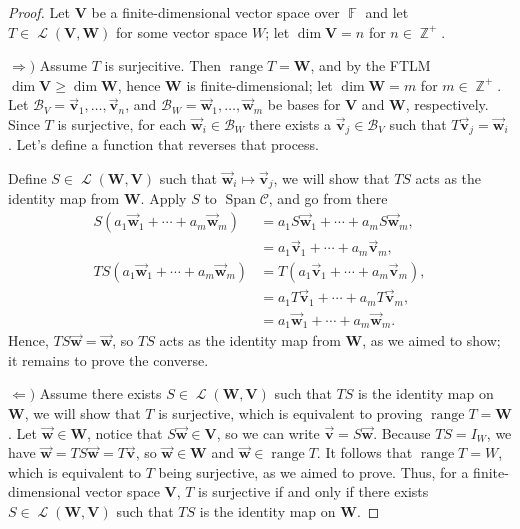 \documentclass[letterpaper, 12pt]{amsart}
\DeclareMathOperator{\Z}{\mathbb{Z}}
\DeclareMathOperator{\F}{\mathbb{F}}
\DeclareMathOperator{\range}{\text{range }}
\DeclareMathOperator{\Ell}{\mathscr{L}}
\newcommand{\bvec}[1]{{\vec{\mathbf{#1}}}}
\theoremstyle{definition}  %
\DeclareMathOperator{\Span}{Span}
\newcommand{\Ra}{\Rightarrow}                   %
\newcommand{\La}{\Leftarrow}                    %
\begin{document}
		\begin{proof}
		Let $\mathbf{V}$ be a finite-dimensional vector space over $\F$ and let $T \in \Ell(\mathbf{V},\mathbf{W})$ for some vector space $W$; let $\dim \mathbf{V} = n$ for $n \in \Z^{+}$.

		$\Ra)$ Assume $T$ is surjecitive.
		Then $\range T = \mathbf{W}$, and by the FTLM $\dim \mathbf{V} \geq \dim \mathbf{W}$, hence $\mathbf{W}$ is finite-dimensional; let $\dim \mathbf{W} = m$ for $m \in \Z^{+}$.
		Let $\mathcal{B}_{V} = \bvec{v}_{1}, \dots, \bvec{v}_{n}$, and $\mathcal{B}_{W} = \bvec{w}_{1}, \dots, \bvec{w}_{m}$ be bases for $\mathbf{V}$ and $\mathbf{W}$, respectively.
		Since $T$ is surjective, for each $\bvec{w}_{i} \in \mathcal{B}_{W}$ there exists a $\bvec{v}_{j} \in \mathcal{B}_{V}$ such that $T\bvec{v}_{j} = \bvec{w}_{i}$.
		Let's define a function that reverses that process.

		Define $S \in \Ell(\mathbf{W},\mathbf{V})$ such that $\bvec{w}_{i} \mapsto \bvec{v}_{j}$, we will show that $TS$ acts as the identity map from $\mathbf{W}$.
		Apply $S$ to $\Span \mathcal{C}$, and go from there
			\begin{align*}
				S(a_{1}\bvec{w}_{1} + \cdots + a_{m}\bvec{w}_{m}) &= a_{1}S\bvec{w}_{1} + \cdots + a_{m}S\bvec{w}_{m}, \\
				&= a_{1}\bvec{v}_{1} + \cdots + a_{m}\bvec{v}_{m}, \\
				TS(a_{1}\bvec{w}_{1} + \cdots + a_{m}\bvec{w}_{m}) &= T(a_{1}\bvec{v}_{1} + \cdots + a_{m}\bvec{v}_{m}), \\
				&= a_{1}T\bvec{v}_{1} + \cdots + a_{m}T\bvec{v}_{m}, \\
				&= a_{1}\bvec{w}_{1} + \cdots + a_{m}\bvec{w}_{m}.
			\end{align*}
		Hence, $TS\bvec{w} = \bvec{w}$, so $TS$ acts as the identity map from $\mathbf{W}$, as we aimed to show; it remains to prove the converse.

		$\La)$ Assume there exists $S \in \Ell(\mathbf{W},\mathbf{V})$ such that $TS$ is the identity map on $\mathbf{W}$, we will show that $T$ is surjective, which is equivalent to proving $\range T = \mathbf{W}$.
		Let $\bvec{w} \in \mathbf{W}$, notice that $S\bvec{w} \in \mathbf{V}$, so we can write $\bvec{v} = S\bvec{w}$.
		Because $TS = I_{W}$, we have $\bvec{w} = TS\bvec{w} = T\bvec{v}$, so $\bvec{w} \in \mathbf{W}$ and $\bvec{w} \in \range T$.
		It follows that $\range T = W$, which is equivalent to $T$ being surjective, as we aimed to prove.
		Thus, for a finite-dimensional vector space $\mathbf{V}$, $T$ is surjective if and only if there exists $S \in \Ell(\mathbf{W},\mathbf{V})$ such that $TS$ is the identity map on $\mathbf{W}$.
		\end{proof}
\end{document}
